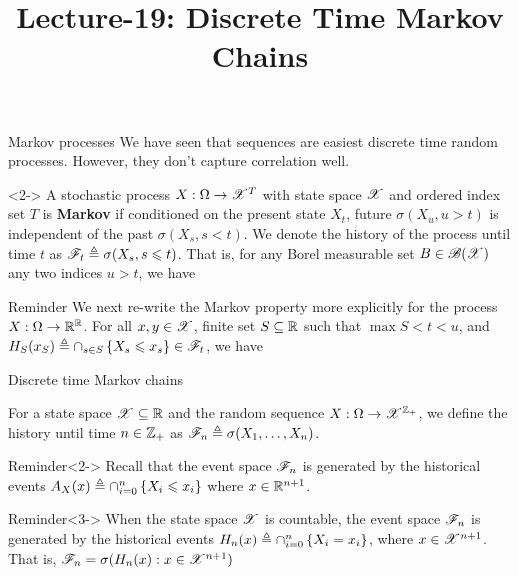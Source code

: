 \documentclass[12pt,aspectratio=169]{beamer}
\title{ Lecture-19: Discrete Time Markov Chains}
\date{}
\begin{document}
\pagestyle{empty}
\maketitle

\begin{frame}{Markov processes}
We have seen that \iid sequences are easiest discrete time random processes. 
However, they don't capture correlation well. 
\begin{Definition}<2->
A stochastic process $X:\Omega\to\mathscr{X}^T$ with state space $\mathscr{X}$ and ordered index set $T$ is \textbf{Markov} if conditioned on the present state $X_t$, future $\sigma(X_u, u > t)$ is independent of the past $\sigma(X_s, s< t)$. 
We denote the history of the process until time $t$ as $\mathscr{F}_t \triangleq \sigma(X_s, s \leqslant t)$. 
That is, for any Borel measurable set $B \in \mathscr{B}(\mathscr{X})$ %
any two indices $u > t$, we have  %
\end{Definition}
\end{frame}

\begin{frame}
\begin{block}{Reminder}
We next re-write the Markov property more explicitly for the process $X:\Omega\to\mathbb{R}^{\mathbb{R}}$. 
For all $x, y \in \mathscr{X}$, finite set $S \subseteq \mathbb{R}$ such that $\max S < t < u$, and $H_S(x_S) \triangleq \cap_{s \in S}\left\{X_s \leqslant x_s\right\} \in \mathscr{F}_t$, we have 
\end{block}
\end{frame}

\begin{frame}{Discrete time Markov chains}
\begin{Definition}
For a state space $\mathscr{X} \subseteq \mathbb{R}$ and the random sequence $X: \Omega \to \mathscr{X}^{\mathbb{Z}_+}$, 
we define the history until time $n \in \mathbb{Z}_+$ as $\mathscr{F}_n \triangleq \sigma(X_1, \dots, X_n)$. 
\end{Definition} 
\begin{block}{Reminder}<2->
Recall that the event space $\mathscr{F}_n$ is generated by the historical events $A_X(x) \triangleq \cap_{i=0}^n\left\{X_i \leqslant x_i\right\}$ where $x \in \mathbb{R}^{n+1}$.
\end{block}
\begin{block}{Reminder}<3-> 
When the state space $\mathscr{X}$ is countable, the event space $\mathscr{F}_n$ is generated by the historical events $H_n(x) \triangleq \cap_{i=0}^n\left\{X_i = x_i\right\}$, where $x \in \mathscr{X}^{n+1}$. 
That is, $\mathscr{F}_n = \sigma(H_n(x):x \in \mathscr{X}^{n+1})$
\end{block}
\end{frame}
\end{document}
